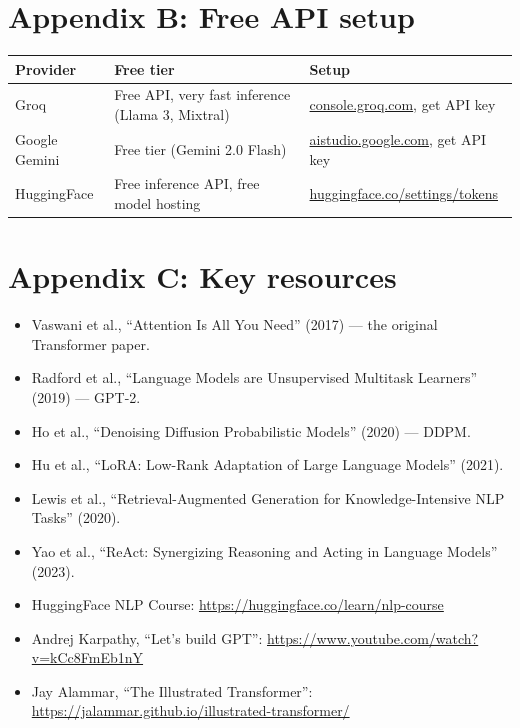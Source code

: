 \documentclass[12pt,a4paper,twoside]{book}
\begin{document}
\chapter*{Appendix B: Free API setup}

\begin{longtable}{p{3cm}p{5cm}p{5.5cm}}
\toprule
\textbf{Provider} & \textbf{Free tier} & \textbf{Setup} \\
\midrule
Groq & Free API, very fast inference (Llama 3, Mixtral) & \url{console.groq.com}, get API key \\
Google Gemini & Free tier (Gemini 2.0 Flash) & \url{aistudio.google.com}, get API key \\
HuggingFace & Free inference API, free model hosting & \url{huggingface.co/settings/tokens} \\
\bottomrule
\end{longtable}

\chapter*{Appendix C: Key resources}

\begin{itemize}
  \item Vaswani et al., ``Attention Is All You Need'' (2017) --- the original Transformer paper.
  \item Radford et al., ``Language Models are Unsupervised Multitask Learners'' (2019) --- GPT-2.
  \item Ho et al., ``Denoising Diffusion Probabilistic Models'' (2020) --- DDPM.
  \item Hu et al., ``LoRA: Low-Rank Adaptation of Large Language Models'' (2021).
  \item Lewis et al., ``Retrieval-Augmented Generation for Knowledge-Intensive NLP Tasks'' (2020).
  \item Yao et al., ``ReAct: Synergizing Reasoning and Acting in Language Models'' (2023).
  \item HuggingFace NLP Course: \url{https://huggingface.co/learn/nlp-course}
  \item Andrej Karpathy, ``Let's build GPT'': \url{https://www.youtube.com/watch?v=kCc8FmEb1nY}
  \item Jay Alammar, ``The Illustrated Transformer'': \url{https://jalammar.github.io/illustrated-transformer/}
\end{itemize}




\printindex
\end{document}
